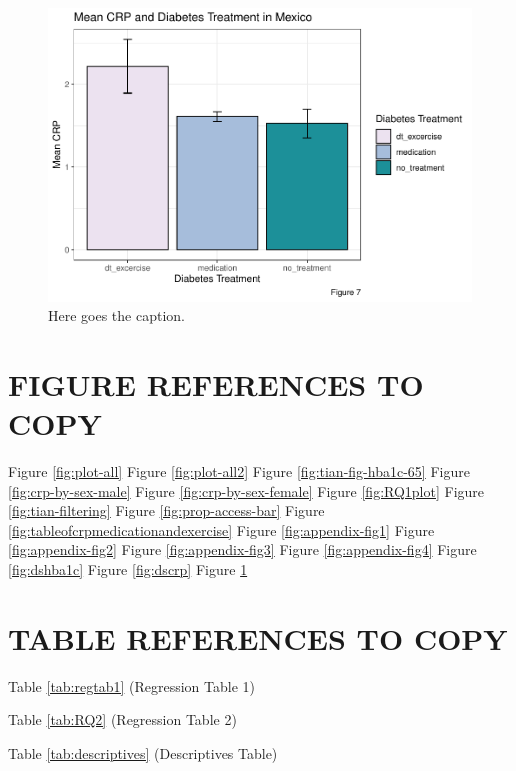 \documentclass[
  man]{apa6}
\begin{document}
\begin{figure}
\centering
\includegraphics{NEW_Final_Groupof5_files/figure-latex/treat-fig-1.pdf}
\caption{\label{fig:treat-fig}Here goes the caption.}
\end{figure}



\hypertarget{figure-references-to-copy}{%
\section{FIGURE REFERENCES TO COPY}\label{figure-references-to-copy}}

Figure \ref{fig:plot-all}
Figure \ref{fig:plot-all2}
Figure \ref{fig:tian-fig-hba1c-65}
Figure \ref{fig:crp-by-sex-male}
Figure \ref{fig:crp-by-sex-female}
Figure \ref{fig:RQ1plot}
Figure \ref{fig:tian-filtering}
Figure \ref{fig:prop-access-bar}
Figure \ref{fig:tableofcrpmedicationandexercise}
Figure \ref{fig:appendix-fig1}
Figure \ref{fig:appendix-fig2}
Figure \ref{fig:appendix-fig3}
Figure \ref{fig:appendix-fig4}
Figure \ref{fig:dshba1c}
Figure \ref{fig:dscrp}
Figure \ref{fig:treat-fig}

\hypertarget{table-references-to-copy}{%
\section{TABLE REFERENCES TO COPY}\label{table-references-to-copy}}

Table \ref{tab:regtab1} (Regression Table 1)

Table \ref{tab:RQ2} (Regression Table 2)

Table \ref{tab:descriptives} (Descriptives Table)
\end{document}
